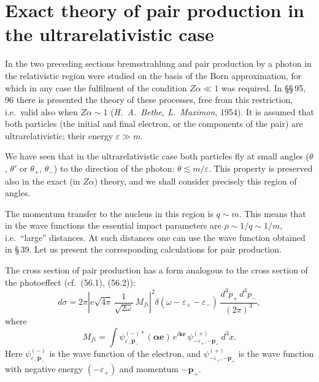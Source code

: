 
\section{Exact theory of pair production in the ultrarelativistic case}


In the two preceding sections bremsstrahlung and pair production by a photon in the relativistic region were studied on the basis of the Born approximation, for which in any case the fulfilment of the condition $Z\alpha \ll 1$ was required. In \S\S\,95, 96 there is presented the theory of these processes, free from this restriction, i.e.\ valid also when $Z\alpha \sim 1$ (\emph{H.~A.~Bethe, L.~Maximon}, 1954). It is assumed that both particles (the initial and final electron, or the components of the pair) are ultrarelativistic; their energy $\varepsilon \gg m$.

We have seen that in the ultrarelativistic case both particles fly at small angles ($\theta$, $\theta'$ or $\theta_+$, $\theta_-$) to the direction of the photon: $\theta \lesssim m/\varepsilon$. This property is preserved also in the exact (in $Z\alpha$) theory, and we shall consider precisely this region of angles.

The momentum transfer to the nucleus in this region is $q \sim m$. This means that in the wave functions the essential impact parameters are $\rho \sim 1/q \sim 1/m$, i.e.\ ``large'' distances. At such distances one can use the wave function obtained in \S\,39. Let us present the corresponding calculations for pair production.


The cross section of pair production has a form analogous to the cross section of the photoeffect (cf.\ (56.1), (56.2)):
\begin{equation}
d\sigma = 2\pi\left|e\sqrt{4\pi}\,\frac{1}{\sqrt{2\omega}}\,M_{fi}\right|^2\delta(\omega - \varepsilon_+ - \varepsilon_-)\,\frac{d^3p_+\,d^3p_-}{(2\pi)^3},
\label{eq:95.1}
\end{equation}
where
\begin{equation}
M_{fi} = \int\psi_{\varepsilon_-\mathbf{p}_-}^{(-)*}(\boldsymbol{\alpha}\mathbf{e})\,e^{i\mathbf{k}\mathbf{r}}\,\psi_{-\varepsilon_+,-\mathbf{p}_+}^{(+)}\,d^3x.
\label{eq:95.2}
\end{equation}
Here $\psi_{\varepsilon_-\mathbf{p}_-}^{(-)}$ is the wave function of the electron, and $\psi_{-\varepsilon_+,-\mathbf{p}_+}^{(+)}$ is the wave function with negative energy $(-\varepsilon_+)$ and momentum $-\mathbf{p}_+$.

